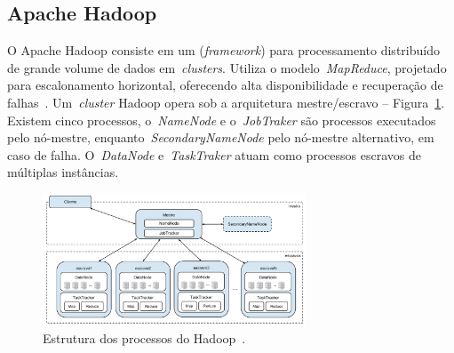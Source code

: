 \documentclass[12pt]{article}
\begin{document}
\subsection{Apache Hadoop}
\label{subsection:hadoop}

O Apache Hadoop consiste em um (\textit{framework}) para processamento distribuído de grande volume de dados em~\emph{clusters}. Utiliza o modelo~\emph{MapReduce}, projetado para escalonamento horizontal, oferecendo alta disponibilidade e recuperação de falhas~\cite{hadoophbase}. Um~\emph{cluster} Hadoop opera sob a arquitetura mestre/escravo -- Figura~\ref{figure:hadoop}. Existem cinco processos, o~\emph{NameNode} e o~\emph{JobTraker} são processos executados pelo nó-mestre, enquanto~\emph{SecondaryNameNode} pelo nó-mestre alternativo, em caso de falha. O~\emph{DataNode} e~\emph{TaskTraker} atuam como processos escravos de múltiplas instâncias. %

\begin{figure}[!ht]
\centering
\includegraphics[width=0.7\textwidth]{images/hadoop.png}
\caption{Estrutura dos processos do Hadoop~\cite{goldman2012apache}.}
\label{figure:hadoop}
\end{figure}


\end{document}
